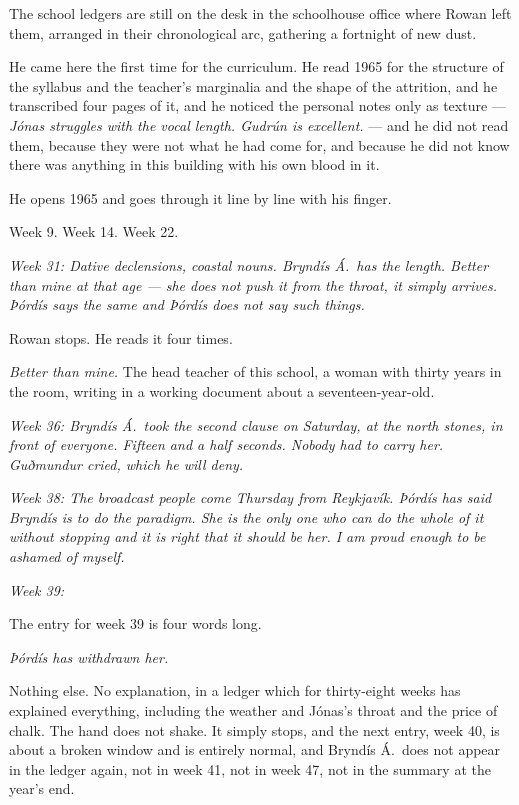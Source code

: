 \documentclass[11pt,oneside]{book}
\newcommand{\sceneline}{%
  \par\vspace{1.2em}
  \begin{center}
    \fontsize{11}{11}\selectfont \textbullet\quad\textbullet\quad\textbullet
  \end{center}
  \vspace{0.6em}\noindent\ignorespaces
}
\begin{document}
\sceneline

The school ledgers are still on the desk in the schoolhouse office where
Rowan left them, arranged in their chronological arc, gathering a
fortnight of new dust.

He came here the first time for the curriculum. He read 1965 for the
structure of the syllabus and the teacher's marginalia and the shape of
the attrition, and he transcribed four pages of it, and he noticed the
personal notes only as texture --- \emph{Jónas struggles with the vocal
length. Gudrún is excellent.} --- and he did not read them, because they
were not what he had come for, and because he did not know there was
anything in this building with his own blood in it.

He opens 1965 and goes through it line by line with his finger.

Week 9. Week 14. Week 22.

\emph{Week 31: Dative declensions, coastal nouns. Bryndís Á.\ has the
length. Better than mine at that age --- she does not push it from the
throat, it simply arrives. Þórdís says the same and Þórdís does not say
such things.}

Rowan stops. He reads it four times.

\emph{Better than mine.} The head teacher of this school, a woman with
thirty years in the room, writing in a working document about a
seventeen-year-old.

\emph{Week 36: Bryndís Á.\ took the second clause on Saturday, at the
north stones, in front of everyone. Fifteen and a half seconds. Nobody
had to carry her. Guðmundur cried, which he will deny.}

\emph{Week 38: The broadcast people come Thursday from Reykjavík.
Þórdís has said Bryndís is to do the paradigm. She is the only one who
can do the whole of it without stopping and it is right that it should
be her. I am proud enough to be ashamed of myself.}

\emph{Week 39:}

The entry for week 39 is four words long.

\emph{Þórdís has withdrawn her.}

Nothing else. No explanation, in a ledger which for thirty-eight weeks
has explained everything, including the weather and Jónas's throat and
the price of chalk. The hand does not shake. It simply stops, and the
next entry, week 40, is about a broken window and is entirely normal,
and Bryndís Á.\ does not appear in the ledger again, not in week 41, not
in week 47, not in the summary at the year's end.
\end{document}
